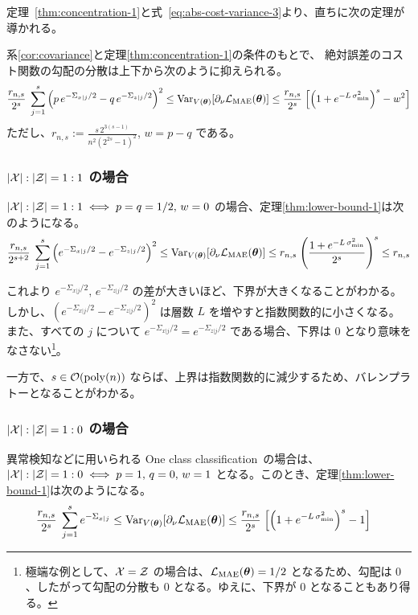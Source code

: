 定理~\ref{thm:concentration-1}と式~\eqref{eq:abs-cost-variance-3}より、直ちに次の定理が導かれる。
\begin{screen}
    \begin{theorem}\label{thm:lower-bound-1}
        系\ref{cor:covariance}と定理\ref{thm:concentration-1}の条件のもとで、
        絶対誤差のコスト関数の勾配の分散は上下から次のように抑えられる。
        \begin{align}
            \frac{r_{n,s}}{2^s}\;
            \sum_{j=1}^s \qty(p\,e^{-\Sigma_{x|j}/2} - q\,e^{-\Sigma_{z|j}/2})^2
            \leq \operatorname{Var}_{V(\boldsymbol{\theta})}[\partial_\nu\mathcal{L}_{\mathrm{MAE}}(\boldsymbol{\theta})]
            \leq \frac{r_{n,s}}{2^s}\;\qty[\qty(1 + e^{-L\,\sigma_{\min}^2})^s - w^2]
        \end{align}
        ただし、$r_{n,s} := \frac{s\,2^{3(s-1)}}{n^2(2^{2s}-1)^2}$, $w = p - q$ である。
    \end{theorem}
\end{screen}

\subsubsection{$|\mathcal{X}|:|\mathcal{Z}| = 1:1$ の場合}
$|\mathcal{X}|:|\mathcal{Z}| = 1:1 \iff p = q = 1/2,\, w = 0$ の場合、定理\ref{thm:lower-bound-1}は次のようになる。
\begin{align}
    \frac{r_{n,s}}{2^{s+2}}\;
    \sum_{j=1}^s
    \qty(e^{-\Sigma_{x|j}/2}- e^{-\Sigma_{z|j}/2})^2
    \leq \operatorname{Var}_{V(\boldsymbol{\theta})}[\partial_\nu\mathcal{L}_{\mathrm{MAE}}(\boldsymbol{\theta})]
    \leq r_{n,s}\;\qty(\frac{1 + e^{-L\,\sigma_{\min}^2}}{2^s})^s
    \leq r_{n,s}
\end{align}

これより $e^{-\Sigma_{x|j}/2},\,e^{-\Sigma_{z|j}/2}$ の差が大きいほど、下界が大きくなることがわかる。しかし、$(e^{-\Sigma_{x|j}/2}- e^{-\Sigma_{z|j}/2})^2$ は層数 $L$ を増やすと指数関数的に小さくなる。
また、すべての $j$ について $e^{-\Sigma_{x|j}/2} = e^{-\Sigma_{z|j}/2}$ である場合、下界は $0$ となり意味をなさない\footnote{極端な例として、$\mathcal{X} = \mathcal{Z}$ の場合は、$\mathcal{L}_{\mathrm{MAE}}(\boldsymbol{\theta}) = 1/2$ となるため、勾配は $0$、したがって勾配の分散も $0$ となる。ゆえに、下界が $0$ となることもあり得る。}。

一方で、$s \in \order{\poly(n)}$ ならば、上界は指数関数的に減少するため、バレンプラトーとなることがわかる。

\subsubsection{$|\mathcal{X}|:|\mathcal{Z}| = 1:0$ の場合}
異常検知などに用いられる One class classification~\cite{khan2014oneclass}の場合は、$|\mathcal{X}|:|\mathcal{Z}| = 1:0 \iff p = 1,\, q = 0,\, w = 1$ となる。このとき、定理\ref{thm:lower-bound-1}は次のようになる。
\begin{align*}
    &\frac{r_{n,s}}{2^s}\;
    \sum_{j=1}^s e^{-\Sigma_{x|j}}
    \leq \operatorname{Var}_{V(\boldsymbol{\theta})}[\partial_\nu\mathcal{L}_{\mathrm{MAE}}(\boldsymbol{\theta})]
    \leq \frac{r_{n,s}}{2^s}\;\qty[\qty(1 + e^{-L\,\sigma_{\min}^2})^s - 1]
\end{align*}

